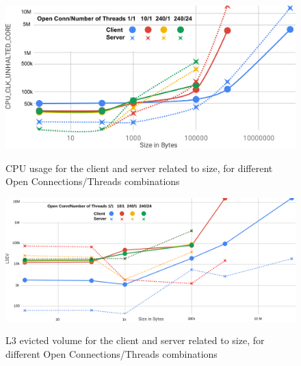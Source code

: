 \documentclass[runningheads]{llncs}
\begin{document}
\begin{figure}
    \centering
    \begin{minipage}{0.49\textwidth}
        \centering\vspace{-2em}
        \includegraphics[width=1\textwidth]{cuc-to-size.png}\vspace{-1em}
        \caption{CPU usage for the client and server related to size, for different Open Connections/Threads combinations}\vspace{-1.5em}
		\label{fig:cuc-to-size}
    \end{minipage}\hfill
    \begin{minipage}{0.49\textwidth}
        \centering\vspace{-2em}
        \includegraphics[width=1\textwidth]{l3ev-to-size.png}\vspace{-1em}
		\caption{L3 evicted volume for the client and server related to size, for different Open Connections/Threads combinations}\vspace{-1.5em}
		\label{fig:l3ev-to-size}
    \end{minipage}
\end{figure}
\end{document}
